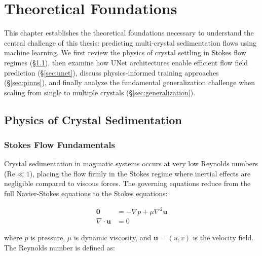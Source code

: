 
\chapter{Theoretical Foundations}
\label{ch:theory}

This chapter establishes the theoretical foundations necessary to understand the central challenge of this thesis: predicting multi-crystal sedimentation flows using machine learning. We first review the physics of crystal settling in Stokes flow regimes (\S\ref{sec:crystal_physics}), then examine how UNet architectures enable efficient flow field prediction (\S\ref{sec:unet}), discuss physics-informed training approaches (\S\ref{sec:pinns}), and finally analyze the fundamental generalization challenge when scaling from single to multiple crystals (\S\ref{sec:generalization}).

\section{Physics of Crystal Sedimentation}
\label{sec:crystal_physics}

\subsection{Stokes Flow Fundamentals}

Crystal sedimentation in magmatic systems occurs at very low Reynolds numbers ($\text{Re} \ll 1$), placing the flow firmly in the Stokes regime where inertial effects are negligible compared to viscous forces. The governing equations reduce from the full Navier-Stokes equations to the Stokes equations:

\begin{align}
\mathbf{0} &= -\nabla p + \mu \nabla^2 \mathbf{u} \label{eq:stokes_momentum}\\
\nabla \cdot \mathbf{u} &= 0 \label{eq:stokes_continuity}
\end{align}

where $p$ is pressure, $\mu$ is dynamic viscosity, and $\mathbf{u} = (u, v)$ is the velocity field. The Reynolds number is defined as:

